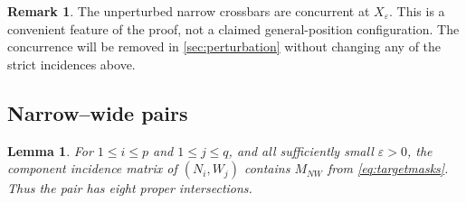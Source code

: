 \documentclass[11pt]{amsart}
\newtheorem{lemma}[lemma]{Lemma}
\theoremstyle{definition}
\newtheorem{remark}[remark]{Remark}
\newcommand{\eps}{\varepsilon}
\begin{document}
\begin{remark}\label{rem:concurrence}
The unperturbed narrow crossbars are concurrent at $X_\eps$.  This is a
convenient feature of the proof, not a claimed general-position
configuration.  The concurrence will be removed in \cref{sec:perturbation}
without changing any of the strict incidences above.
\end{remark}

\subsection{Narrow--wide pairs}

\begin{lemma}\label{lem:NW}
For $1\le i\le p$ and $1\le j\le q$, and all sufficiently small
$\eps>0$, the component incidence matrix of $(N_i,W_j)$ contains $M_{NW}$
from \eqref{eq:targetmasks}.  Thus the pair has eight proper intersections.
\end{lemma}
\end{document}
